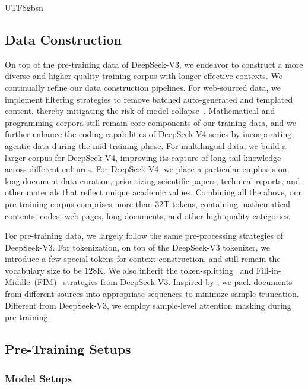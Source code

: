 \documentclass[11pt, a4paper, logo, copyright, nonumbering]{deepseek}
\newcommand{\dsviii}{DeepSeek-V3}
\newcommand{\dsviv}{DeepSeek-V4}
\begin{document}
\begin{CJK*}{UTF8}{gbsn}
\subsection{Data Construction}

On top of the pre-training data of \dsviii{}, we endeavor to construct a more diverse and higher-quality training corpus with longer effective contexts. 
We continually refine our data construction pipelines. 
For web-sourced data, we implement filtering strategies to remove batched auto-generated and templated content, thereby mitigating the risk of model collapse~\citep{zhu2024synthesize}. 
Mathematical and programming corpora still remain core components of our training data, and we further enhance the coding capabilities of \dsviv{} series by incorporating agentic data during the mid-training phase. 
For multilingual data, we build a larger corpus for \dsviv{}, improving its capture of long-tail knowledge across different cultures. 
For \dsviv{}, we place a particular emphasis on long-document data curation, prioritizing scientific papers, technical reports, and other materials that reflect unique academic values. 
Combining all the above, our pre-training corpus comprises more than 32T tokens, containing mathematical contents, codes, web pages, long documents, and other high-quality categories.

For pre-training data, we largely follow the same pre-processing strategies of \dsviii{}. 
For tokenization, on top of the \dsviii{} tokenizer, we introduce a few special tokens for context construction, and still remain the vocabulary size to be 128K.  
We also inherit the token-splitting~\citep{dsv3} and Fill-in-Middle~(FIM)~\citep{dscodervii} strategies from \dsviii{}.
Inspired by \citet{Ding2024FewerTI}, we pack documents from different sources into appropriate sequences to minimize sample truncation.
Different from \dsviii{}, we employ sample-level attention masking during pre-training. 

\subsection{Pre-Training Setups}

\subsubsection{Model Setups}


\end{CJK*}
\end{document}
